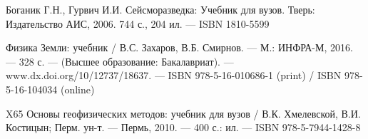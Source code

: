 \begin{thebibliography}{3}
	Боганик Г.Н., Гурвич И.И. Сейсморазведка: Учебник для вузов. Тверь: Издательство АИС, 2006. 744 с., 204 ил. --- ISBN 1810-5599
	
	Физика Земли: учебник / В.С. Захаров, В.Б. Смирнов. --- М.: ИНФРА-М, 2016. --- 328 с. --- (Высшее образование: Бакалавриат). --- www.dx.doi.org/10/12737/18637. --- ISBN 978-5-16-010686-1 (print) / ISBN 978-5-16-104034 (online)
	
	X65 Основы геофизических методов: учебник для вузов / В.К. Хмелевской, В.И. Костицын; Перм. ун-т. --- Пермь, 2010. --- 400 с.: ил. --- ISBN 978-5-7944-1428-8
\end{thebibliography}